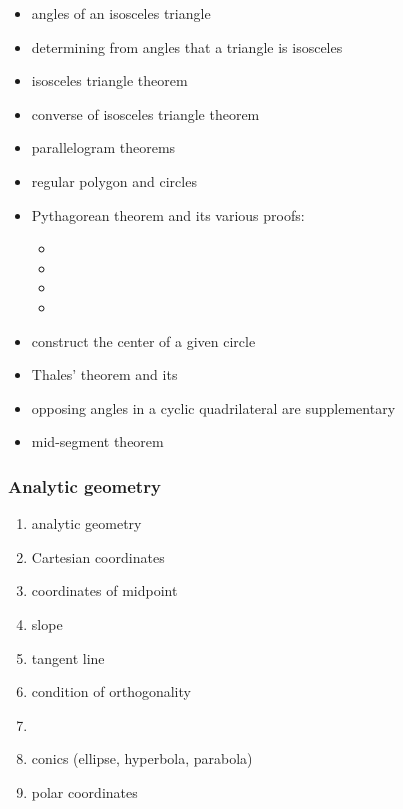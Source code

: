 \documentclass[12pt]{article}
\begin{document}
\begin{enumerate}
\begin{itemize}
\item angles of an isosceles triangle
\item determining from angles that a triangle is isosceles
\item isosceles triangle theorem
\item converse of isosceles triangle theorem
\item parallelogram theorems
\item regular polygon and circles
\item Pythagorean theorem and its various proofs:

\begin{itemize}
\item {}
\item {}
\item {}
\item {}
\end{itemize}

\item construct the center of a given circle
\item Thales' theorem and its 
\item opposing angles in a cyclic quadrilateral are supplementary
\item mid-segment theorem
\end{itemize}
\end{enumerate}

\subsubsection*{Analytic geometry}
\begin{enumerate}
\item analytic geometry
\item Cartesian coordinates
\item coordinates of midpoint
\item slope
\item tangent line
\item condition of orthogonality
\item {}
\item conics (ellipse, hyperbola, parabola)
\item polar coordinates
\end{enumerate}
\end{document}

